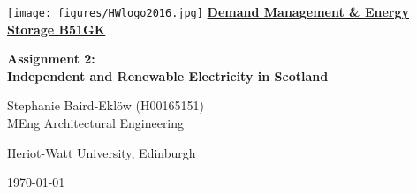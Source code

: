 \documentclass{article}
\numberwithin{equation}{section}
\numberwithin{figure}{section}
\numberwithin{table}{section}
\begin{document}
\begin{titlepage}
    \texttt{[image: figures/HWlogo2016.jpg]} %
    \centering
    \vfill
    {\bfseries\LARGE
        \textbf{\underline{Demand Management \& Energy Storage B51GK}}
    }
    
    {\bfseries\LARGE
        \textbf{Assignment 2:\\
        Independent and Renewable Electricity in Scotland}
    }
  
    
    \vfill
    {\Large
        Stephanie Baird-Ekl\"{o}w (H00165151)\\MEng Architectural Engineering
        
        Heriot-Watt University, Edinburgh
        
        \today
    }
\end{titlepage}



  \newpage
  \large\tableofcontents
  
  


      \newpage
      \listoffigures
      \newpage
      \listoftables
      \newpage

  
  \newpage

  
  \newpage
  
  
  \newpage
  
  
  \newpage
  
  
  \newpage
  
  
  \newpage

  
  \newpage

  
  
\end{document}
